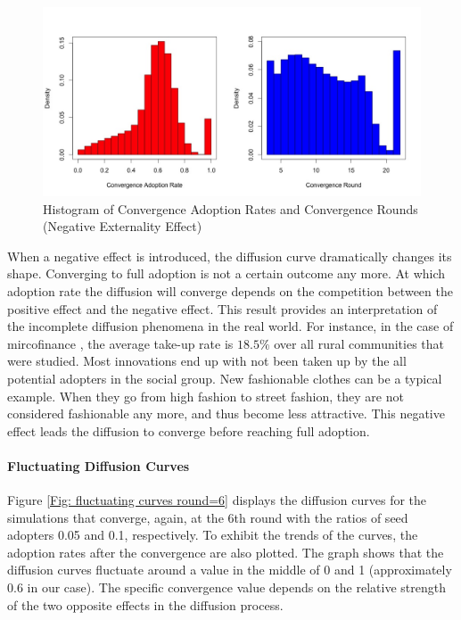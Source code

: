 \documentclass{bmcart}
\renewcommand{\figurename}{Figure }
\begin{document}
\begin{center}
\begin{figure}[ht!]
\centering
\includegraphics[scale=0.35]{Hist_conv_adp_and_round_neg.jpg}
\caption{Histogram of Convergence Adoption Rates and Convergence Rounds (Negative Externality Effect)}
\label{Fig: hist conv adp and round neg}
\end{figure}
\end{center}

When a negative effect is introduced, the diffusion curve dramatically changes its shape. Converging to full adoption is not a certain outcome any more. At which adoption rate the diffusion will converge depends on the competition between the positive effect and the negative effect. This result provides an interpretation of the incomplete diffusion phenomena in the real world. For instance, in the case of mircofinance \cite{Banerjee2013}, the average take-up rate is $18.5\%$ over all rural communities that were studied. Most innovations end up with not been taken up by the all potential adopters in the social group. New fashionable clothes can be a typical example. When they go from high fashion to street fashion, they are not considered fashionable any more, and thus become less attractive. This negative effect leads the diffusion to converge before reaching full adoption.

\paragraph{Fluctuating Diffusion Curves}

\figurename \ref{Fig: fluctuating curves round=6} displays the diffusion curves for the simulations that converge, again, at the 6th round with the ratios of seed adopters 0.05 and 0.1, respectively. To exhibit the trends of the curves, the adoption rates after the convergence are also plotted. The graph shows that the diffusion curves fluctuate around a value in the middle of 0 and 1 (approximately $0.6$ in our case). The specific convergence value depends on the relative strength of the two opposite effects in the diffusion process.
\end{document}
